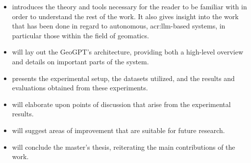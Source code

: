 \begin{itemize}
    \item {} introduces the theory and tools necessary for the reader to be familiar with in order to understand the rest of the work. It also gives insight into the work that has been done in regard to autonomous, \acrshort{acr:llm}-based systems, in particular those within the field of geomatics.
    \item {} will lay out the GeoGPT's architecture, providing both a high-level overview and details on important parts of the system.
    \item {} presents the experimental setup, the datasets utilized, and the results and evaluations obtained from these experiments.
    \item {} will elaborate upon points of discussion that arise from the experimental results.
    \item {} will suggest areas of improvement that are suitable for future research.
    \item {} will conclude the master's thesis, reiterating the main contributions of the work.
\end{itemize}


\glsresetall